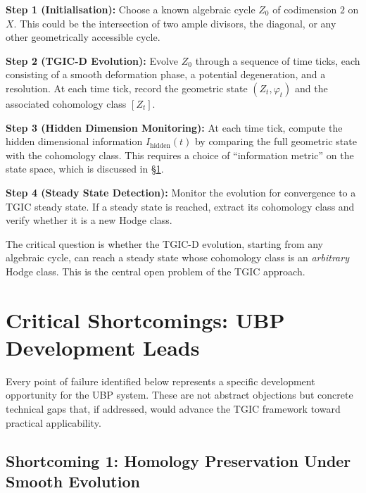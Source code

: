 \documentclass[11pt,a4paper]{article}
\theoremstyle{definition}
\theoremstyle{plain}
\begin{document}
\textbf{Step 1 (Initialisation):} Choose a known algebraic cycle $Z_0$ of codimension $2$ on $X$. This could be the intersection of two ample divisors, the diagonal, or any other geometrically accessible cycle.

\textbf{Step 2 (TGIC-D Evolution):} Evolve $Z_0$ through a sequence of time ticks, each consisting of a smooth deformation phase, a potential degeneration, and a resolution. At each time tick, record the geometric state $(Z_t, \varphi_t)$ and the associated cohomology class $[Z_t]$.

\textbf{Step 3 (Hidden Dimension Monitoring):} At each time tick, compute the hidden dimensional information $I_{\mathrm{hidden}}(t)$ by comparing the full geometric state with the cohomology class. This requires a choice of ``information metric'' on the state space, which is discussed in \S\ref{sec:shortcomings}.

\textbf{Step 4 (Steady State Detection):} Monitor the evolution for convergence to a TGIC steady state. If a steady state is reached, extract its cohomology class and verify whether it is a new Hodge class.

The critical question is whether the TGIC-D evolution, starting from any algebraic cycle, can reach a steady state whose cohomology class is an \emph{arbitrary} Hodge class. This is the central open problem of the TGIC approach.


\section{Critical Shortcomings: UBP Development Leads}\label{sec:shortcomings}

Every point of failure identified below represents a specific development opportunity for the UBP system. These are not abstract objections but concrete technical gaps that, if addressed, would advance the TGIC framework toward practical applicability.

\subsection{Shortcoming 1: Homology Preservation Under Smooth Evolution}\label{sec:sc1}
\end{document}
